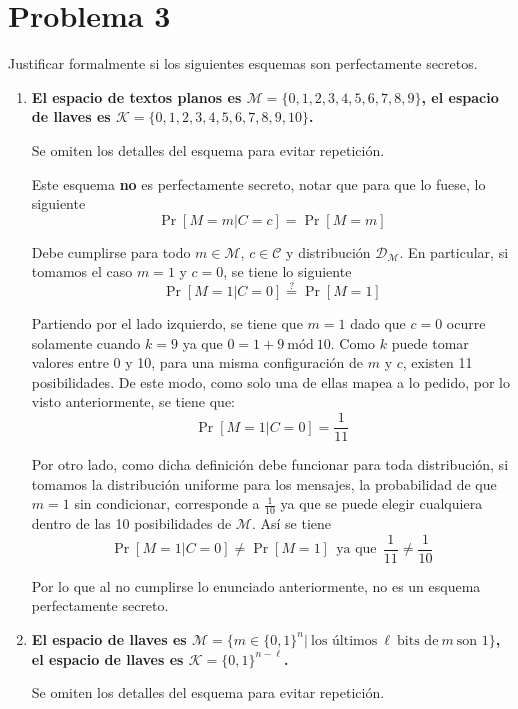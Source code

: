 \documentclass[twoside]{tareas}
\begin{document}
\section*{Problema 3}

Justificar formalmente si los siguientes esquemas son perfectamente secretos.

\begin{enumerate}
    \item \textbf{El espacio de textos planos es $\mathcal{M} = \{0, 1, 2, 3, 4, 5, 6, 7, 8, 9\}$, el
espacio de llaves es $\mathcal{K} = \{0, 1, 2, 3, 4, 5, 6, 7, 8, 9, 10\}$.}

    Se omiten los detalles del esquema para evitar repetición.

    Este esquema \textbf{no} es perfectamente secreto, notar que para que lo fuese, lo siguiente
    $$\Pr[M=m | C=c] = \Pr[M=m]$$

    Debe cumplirse para todo $m \in \mathcal{M}$, $c \in \mathcal{C}$ y distribución $\mathcal{D}_{\mathcal{M}}$. En particular, si tomamos el caso $m=1$ y $c=0$, se tiene lo siguiente
    $$\Pr[M=1 | C=0] \stackrel{?}{=} \Pr[M=1]$$

    Partiendo por el lado izquierdo, se tiene que $m=1$ dado que $c=0$ ocurre solamente cuando $k=9$ ya que $0 = 1 + 9 \ \text{mód} \ 10$. Como $k$ puede tomar valores entre 0 y 10, para una misma configuración de $m$ y $c$, existen 11 posibilidades. De este modo, como solo una de ellas mapea a lo pedido, por lo visto anteriormente, se tiene que:
    $$\Pr[M=1 | C=0] = \frac{1}{11}$$

    Por otro lado, como dicha definición debe funcionar para toda distribución, si tomamos la distribución uniforme para los mensajes, la probabilidad de que $m=1$ sin condicionar, corresponde a $\frac{1}{10}$ ya que se puede elegir cualquiera dentro de las 10 posibilidades de $\mathcal{M}$. Así se tiene
    $$\Pr[M=1 | C=0] \neq \Pr[M=1] \ \ \text{ya que} \ \ \frac{1}{11} \neq \frac{1}{10}$$

    Por lo que al no cumplirse lo enunciado anteriormente, no es un esquema perfectamente secreto.

    \item \textbf{El espacio de llaves es $\mathcal{M} = \{m \in \{0, 1\}^n | \ \text{los últimos} \ \ell \ \text{bits de}\ m \ \text{son 1}\}$, el espacio de llaves es $\mathcal{K} = \{0, 1\}^{n-\ell}$.}

    Se omiten los detalles del esquema para evitar repetición.


\end{enumerate}
\end{document}
